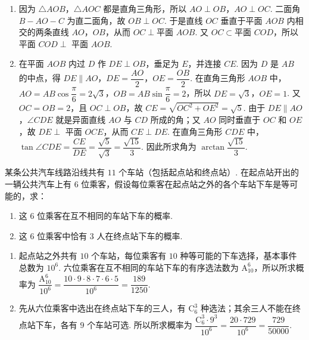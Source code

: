 \begin{solution}
\begin{enumerate}
\item 因为 \(\triangle AOB\)，\(\triangle AOC\) 都是直角三角形，所以 \(AO\perp OB\)，\(AO\perp OC\). 二面角 \(B-AO-C\) 为直二面角，故 \(OB\perp OC\). 于是直线 \(OC\) 垂直于平面 \(AOB\) 内相交的两条直线 \(AO\)，\(OB\)，从而 \(OC\perp\text{平面 }AOB\). 又 \(OC\subset\text{平面 }COD\)，所以平面 \(COD\perp\) 平面 \(AOB\).
\item 在平面 \(AOB\) 内过 \(D\) 作 \(DE\perp OB\)，垂足为 \(E\)，并连接 \(CE\). 因为 \(D\) 是 \(AB\) 的中点，得 \(DE\parallel AO\)，\(DE=\dfrac{AO}{2}\)，\(OE=\dfrac{OB}{2}\). 在直角三角形 \(AOB\) 中，\(AO=AB\cos\dfrac\pi6=2\sqrt3\)，\(OB=AB\sin\dfrac\pi6=2\)，所以 \(DE=\sqrt3\)，\(OE=1\). 又 \(OC=OB=2\)，且 \(OC\perp OB\)，故 \(CE=\sqrt{OC^2+OE^2}=\sqrt5\). 由于 \(DE\parallel AO\)，\(\angle CDE\) 就是异面直线 \(AO\) 与 \(CD\) 所成的角；又 \(AO\) 同时垂直于 \(OC\) 和 \(OE\)，故 \(DE\perp\) 平面 \(OCE\)，从而 \(CE\perp DE\). 在直角三角形 \(CDE\) 中，\(\tan\angle CDE=\dfrac{CE}{DE}=\dfrac{\sqrt5}{\sqrt3}=\dfrac{\sqrt{15}}3\). 因此所求角为 \(\arctan\dfrac{\sqrt{15}}3\).
\end{enumerate}
\end{solution}

\begin{problem}
某条公共汽车线路沿线共有 \(11\) 个车站（包括起点站和终点站）. 在起点站开出的一辆公共汽车上有 \(6\) 位乘客，假设每位乘客在起点站之外的各个车站下车是等可能的，求：

\begin{enumerate}
\item 这 \(6\) 位乘客在互不相同的车站下车的概率.
\item 这 \(6\) 位乘客中恰有 \(3\) 人在终点站下车的概率.
\end{enumerate}
\end{problem}

\begin{solution}
\begin{enumerate}
\item 起点站之外共有 \(10\) 个车站，每位乘客有 \(10\) 种等可能的下车选择，基本事件总数为 \(10^6\). 六位乘客在互不相同的车站下车的有序选法数为 \(\mathrm A_{10}^{6}\)，所以所求概率为
\(\dfrac{\mathrm A_{10}^{6}}{10^6}=\dfrac{10\cdot9\cdot8\cdot7\cdot6\cdot5}{10^6}=\dfrac{189}{1250}\).
\item 先从六位乘客中选出在终点站下车的三人，有 \(\mathrm C_6^3\) 种选法；其余三人不能在终点站下车，各有 \(9\) 个车站可选. 所以所求概率为
\(\dfrac{\mathrm C_6^3\cdot9^3}{10^6}=\dfrac{20\cdot729}{10^6}=\dfrac{729}{50000}\).
\end{enumerate}
\end{solution}


